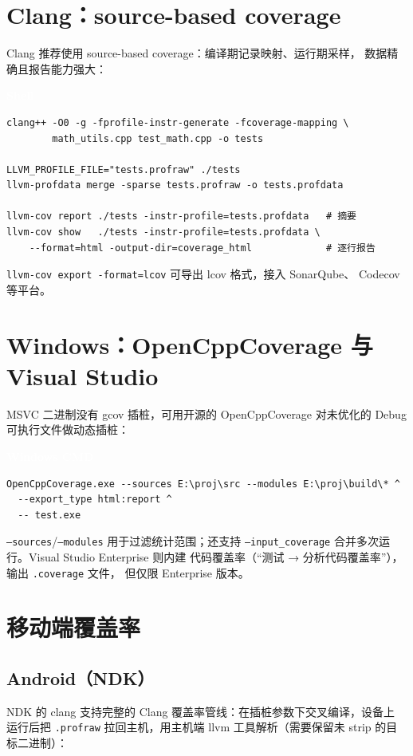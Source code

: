 \documentclass[12pt,a4paper,fontset=fandol]{ctexbook}
\newcommand{\bashlabel}{%
  \begin{tcolorbox}[enhanced,colback=black!80,colframe=black!80,
    arc=1mm,boxrule=0mm,left=6pt,right=6pt,top=2pt,bottom=2pt,
    halign=left,oversize]
    \textcolor{white}{\small\bfseries Shell}
  \end{tcolorbox}\vspace{-4pt}}
\newcommand{\cmdlabel}{%
  \begin{tcolorbox}[enhanced,colback=black!60,colframe=black!60,
    arc=1mm,boxrule=0mm,left=6pt,right=6pt,top=2pt,bottom=2pt,
    halign=left,oversize]
    \textcolor{white}{\small\bfseries Windows CMD}
  \end{tcolorbox}\vspace{-4pt}}
\begin{document}
\section{Clang：source-based coverage}

Clang 推荐使用 source-based coverage：编译期记录映射、运行期采样，
数据精确且报告能力强大：

\bashlabel
\begin{lstlisting}
clang++ -O0 -g -fprofile-instr-generate -fcoverage-mapping \
        math_utils.cpp test_math.cpp -o tests

LLVM_PROFILE_FILE="tests.profraw" ./tests
llvm-profdata merge -sparse tests.profraw -o tests.profdata

llvm-cov report ./tests -instr-profile=tests.profdata   # 摘要
llvm-cov show   ./tests -instr-profile=tests.profdata \
    --format=html -output-dir=coverage_html             # 逐行报告
\end{lstlisting}

\texttt{llvm-cov export -format=lcov} 可导出 lcov 格式，接入 SonarQube、
Codecov 等平台。

\section{Windows：OpenCppCoverage 与 Visual Studio}

MSVC 二进制没有 gcov 插桩，可用开源的 OpenCppCoverage 对未优化的
Debug 可执行文件做动态插桩：

\cmdlabel
\begin{lstlisting}
OpenCppCoverage.exe --sources E:\proj\src --modules E:\proj\build\* ^
  --export_type html:report ^
  -- test.exe
\end{lstlisting}

\texttt{--sources}/\allowbreak{}\texttt{--modules} 用于过滤统计范围；还支持
\texttt{--input\_coverage} 合并多次运行。Visual Studio Enterprise 则内建
代码覆盖率（“测试 → 分析代码覆盖率”），输出 \texttt{.coverage} 文件，
但仅限 Enterprise 版本。

\section{移动端覆盖率}

\subsection{Android（NDK）}

NDK 的 clang 支持完整的 Clang 覆盖率管线：在插桩参数下交叉编译，设备上
运行后把 \texttt{.profraw} 拉回主机，用主机端 llvm 工具解析（需要保留未
strip 的目标二进制）：
\end{document}
